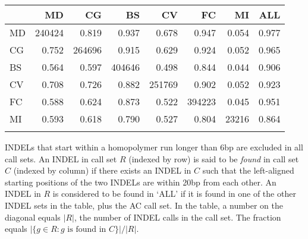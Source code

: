 \documentclass{bioinfo}
\begin{document}


\begin{table}[tb]
{%
\begin{tabular}{lrrrrrrr}
\toprule
   &     MD &     CG &     BS &     CV &     FC &     MI &    ALL \\
\midrule
MD & 240424 &  0.819 &  0.937 &  0.678 &  0.947 &  0.054 &  0.977 \\
CG &  0.752 & 264696 &  0.915 &  0.629 &  0.924 &  0.052 &  0.965 \\
BS &  0.564 &  0.597 & 404646 &  0.498 &  0.844 &  0.044 &  0.906 \\
CV &  0.708 &  0.726 &  0.882 & 251769 &  0.902 &  0.052 &  0.923 \\
FC &  0.588 &  0.624 &  0.873 &  0.522 & 394223 &  0.045 &  0.951 \\
MI &  0.593 &  0.618 &  0.790 &  0.527 &  0.804 &  23216 &  0.864 \\
\botrule
\end{tabular}}
{INDELs that start within a homopolymer run longer than 6bp are excluded in all
call sets. An INDEL in call set $R$ (indexed by row) is said to be \emph{found}
in call set $C$ (indexed by column) if there exists an INDEL in $C$ such that
the left-aligned starting positions of the two INDELs are within 20bp from each
other.  An INDEL in $R$ is considered to be found in `ALL' if it is found in
one of the other INDEL sets in the table, plus the AC call set.  In the table,
a number on the diagonal equals $|R|$, the number of INDEL calls in the call
set. The fraction equals $|\{g\in R:g \mbox{ is found in } C\}|/|R|$.}
\end{table}
\end{document}

